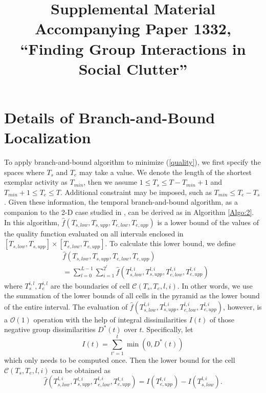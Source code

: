 \documentclass[10pt,twocolumn,letterpaper]{article}
\begin{document}
\title{Supplemental Material Accompanying Paper 1332,\\ ``Finding Group Interactions in Social Clutter''}

\maketitle


\section{Details of Branch-and-Bound Localization}
\label{detailBB}

To apply branch-and-bound algorithm to minimize (\ref{quality}), we first specify the spaces where $T_{s}$ and $T_{e}$ may take a value. We denote the length of the shortest exemplar activity as $T_{min}$, then we assume $1\leq T_{s}\leq T-T_{min}+1$ and $T_{min}+1\leq T_{e}\leq T$. Additional constraint may be imposed, such as $T_{min}\leq T_{e}-T_{s}$. Given these information,  the temporal branch-and-bound algorithm, as a companion to the 2-D case studied in \cite{Lampert}, can be derived as in Algorithm \ref{Algo:2}.  In this algorithm, $\hat{f}(T_{s,low}, T_{s,upp}, T_{e,low}, T_{e,upp})$ is a lower bound of the values of the quality function evaluated on all intervals enclosed in $[T_{s,low}, T_{s,upp}]\times [T_{e,low}, T_{e,upp}]$. To calculate this lower bound, we define
\begin{equation}
\begin{split}
&\hat{f}(T_{s,low}, T_{s,upp}, T_{e,low}, T_{e,upp})\\
&=\sum^{L-1}_{l=0}\sum^{2^{l}}_{i=1} \hat{f}(T^{l,i}_{s,low}, T^{l,i}_{s,upp}, T^{l,i}_{e,low}, T^{l,i}_{e,upp})
\end{split}
\end{equation}
where $T^{i,l}_{s}, T^{i,l}_{e}$ are the boundaries of cell $\mathcal{C}(T_{s},T_{e}, l,i)$. In other words, we use the summation of the lower bounds of all cells in the pyramid as the lower bound of the entire interval. The evaluation of $\hat{f}(T^{l,i}_{s,low}, T^{l,i}_{s,upp}, T^{l,i}_{e,low}, T^{l,i}_{e,upp})$, however, is a $\mathcal{O}(1)$ operation with the help of integral dissimilarities $I(t)$ of those negative group dissimilarities $D^{*}(t)$ over $t$. Specifically, let
\begin{equation}
I(t)=\sum^{t}_{t'=1} \min(0,D^{*}(t))
\end{equation}
which only needs to be computed once. Then the lower bound for the cell $\mathcal{C}(T_{s},T_{e}, l,i)$ can be obtained as
\begin{equation}
\hat{f}(T^{l,i}_{s,low}, T^{l,i}_{s,upp}, T^{l,i}_{e,low}, T^{l,i}_{e,upp})=I(T^{l,i}_{e,upp})-I(T^{l,i}_{s,low}).
\end{equation}
\end{document}
